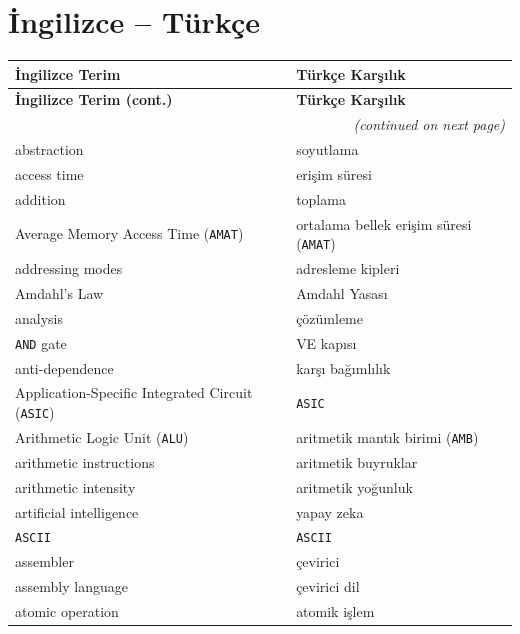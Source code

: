 \bigskip

\section*{İngilizce -- Türkçe}

{\small
\begin{longtable}{@{}p{7.6cm}p{7.6cm}@{}}
\toprule
\textbf{İngilizce Terim} & \textbf{Türkçe Karşılık} \\
\midrule
\endfirsthead

\toprule
\textbf{İngilizce Terim (cont.)} & \textbf{Türkçe Karşılık} \\
\midrule
\endhead

\midrule
\multicolumn{2}{r}{\small\textit{(continued on next page)}} \\
\endfoot

\bottomrule
\endlastfoot

abstraction & soyutlama \\
access time & erişim süresi \\
addition & toplama \\
Average Memory Access Time (\texttt{AMAT}) & ortalama bellek erişim süresi (\texttt{AMAT}) \\
addressing modes & adresleme kipleri \\
Amdahl's Law & Amdahl Yasası \\
analysis & çözümleme \\
\texttt{AND} gate & VE kapısı \\
anti-dependence & karşı bağımlılık \\
Application-Specific Integrated Circuit (\texttt{ASIC}) & \texttt{ASIC} \\
Arithmetic Logic Unit (\texttt{ALU}) & aritmetik mantık birimi (\texttt{AMB}) \\
arithmetic instructions & aritmetik buyruklar \\
arithmetic intensity & aritmetik yoğunluk \\
artificial intelligence & yapay zeka \\
\texttt{ASCII} & \texttt{ASCII} \\
assembler & çevirici \\
assembly language & çevirici dil \\
atomic operation & atomik işlem \\


\end{longtable}}
